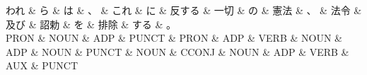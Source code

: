 \documentclass[tikz,border=5pt]{standalone}
\begin{document}
\normalsize
\begin{dependency}[edge unit distance=12.0pt]
    \begin{deptext}[column sep=1em]
        われ \& ら \& は \& 、 \& これ \& に \& 反する \& 一切 \& の \& 憲法 \& 、 \& 法令 \& 及び \& 詔勅 \& を \& 排除 \& する \& 。\\
        PRON \& NOUN \& ADP \& PUNCT \& PRON \& ADP \& VERB \& NOUN \& ADP \& NOUN \& PUNCT \& NOUN \& CCONJ \& NOUN \& ADP \& VERB \& AUX \& PUNCT\\
    \end{deptext}
\end{dependency}
\end{document}
